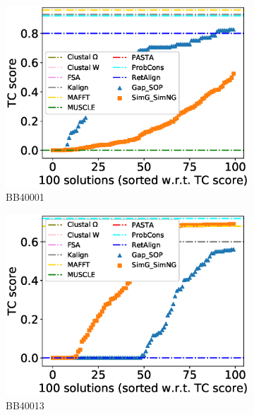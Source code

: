 \begin{figure}[!htbp]
	\centering
	\begin{adjustwidth}{-1.5cm}{-1cm}
		\begin{subfigure}{0.22\textwidth}
			\includegraphics[width=\columnwidth]{Figure/summary/precomputedInit/Balibase/BB40001_tc_density_single_run_2}
			\caption{BB40001}
		\end{subfigure}	
		\begin{subfigure}{0.22\textwidth}
			\includegraphics[width=\columnwidth]{Figure/summary/precomputedInit/Balibase/BB40013_tc_density_single_run_2}
			\caption{BB40013}
		\end{subfigure}
		\begin{subfigure}{0.22\textwidth}

\end{subfigure}
\end{adjustwidth}
\end{figure}
